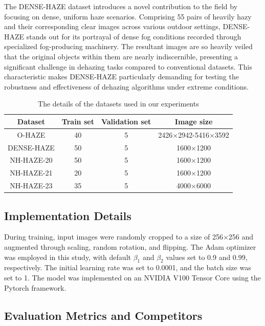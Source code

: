 \documentclass[lettersize,journal]{IEEEtran}
\begin{document}
The DENSE-HAZE dataset introduces a novel contribution to the field by focusing on dense, uniform haze scenarios. Comprising 55 pairs of heavily hazy and their corresponding clear images across various outdoor settings, DENSE-HAZE stands out for its portrayal of dense fog conditions recorded through specialized fog-producing machinery. The resultant images are so heavily veiled that the original objects within them are nearly indiscernible, presenting a significant challenge in dehazing tasks compared to conventional datasets. This characteristic makes DENSE-HAZE particularly demanding for testing the robustness and effectiveness of dehazing algorithms under extreme conditions.

\begin{table}
	\begin{center}
		\caption{The details of the datasets used in our experiments}
		\label{table_dataset}
		\begin{tabular}{ c | c | c | c }
			\hline
			Dataset & Train set & Validation set & Image size \\
			\hline
			O-HAZE & 40 & 5 & 2426×2942-5416×3592 \\
			DENSE-HAZE & 50 & 5 & 1600×1200 \\
			NH-HAZE-20 & 50 & 5 & 1600×1200 \\
			NH-HAZE-21 & 20 & 5 & 1600×1200 \\
			NH-HAZE-23 & 35 & 5 & 4000×6000 \\
			\hline			
		\end{tabular}
	\end{center}
\end{table}

\subsection{Implementation Details}


During training, input images were randomly cropped to a size of 256×256 and augmented through scaling, random rotation, and flipping. The Adam optimizer\cite{kingma2014adam} was employed in this study, with default $\beta_{1}$ and $\beta_{2}$ values set to 0.9 and 0.99, respectively. The initial learning rate was set to 0.0001, and the batch size was set to 1. The model was implemented on an NVIDIA V100 Tensor Core using the Pytorch framework.

\subsection{Evaluation Metrics and Competitors}
\end{document}
